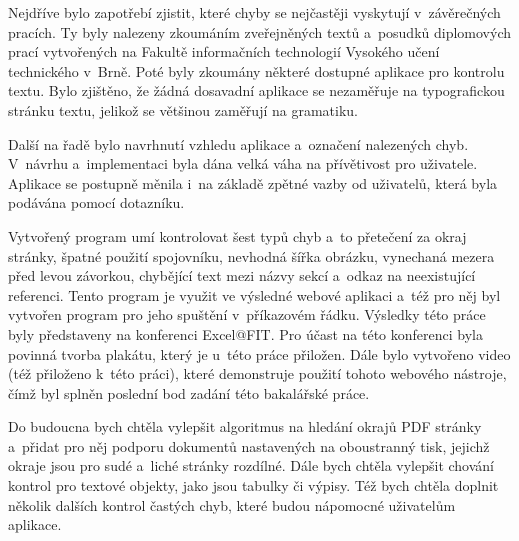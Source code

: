 Nejdříve bylo zapotřebí zjistit, které chyby se nejčastěji vyskytují v~závěrečných
pracích. Ty byly nalezeny zkoumáním zveřejněných textů a~posudků diplomových prací
vytvořených na Fakultě informačních technologií Vysokého učení technického v~Brně.
Poté byly zkoumány některé dostupné aplikace pro kontrolu textu. Bylo zjištěno,
že žádná dosavadní aplikace se nezaměřuje na typografickou stránku textu, jelikož
se většinou zaměřují na gramatiku.

Další na řadě bylo navrhnutí vzhledu aplikace a~označení nalezených chyb.
V~návrhu a~implementaci byla dána velká váha na přívětivost pro uživatele.
Aplikace se postupně měnila i~na základě zpětné vazby od uživatelů, která byla
podávána pomocí dotazníku.

Vytvořený program umí kontrolovat šest typů chyb a~to přetečení za okraj stránky, 
špatné použití spojovníku, nevhodná šířka obrázku, vynechaná mezera před levou
závorkou, chybějící text mezi názvy sekcí a~odkaz na neexistující referenci.
Tento program je využit ve výsledné webové aplikaci a~též pro něj byl 
vytvořen program pro jeho spuštění v~příkazovém řádku.
Výsledky této práce byly představeny na konferenci Excel@FIT. Pro
účast na této konferenci byla povinná tvorba plakátu, který je u~této
práce přiložen.
Dále bylo vytvořeno video (též přiloženo k~této práci), které
demonstruje použití tohoto webového nástroje, čímž byl splněn poslední bod
zadání této bakalářské práce.

Do budoucna bych chtěla vylepšit algoritmus na hledání okrajů PDF stránky
a~přidat pro něj podporu dokumentů nastavených na oboustranný tisk, jejichž
okraje jsou pro sudé a~liché stránky rozdílné. Dále bych chtěla vylepšit chování
kontrol pro textové objekty, jako jsou tabulky či výpisy. Též bych chtěla doplnit
několik dalších kontrol častých chyb, které budou nápomocné uživatelům aplikace.






%
